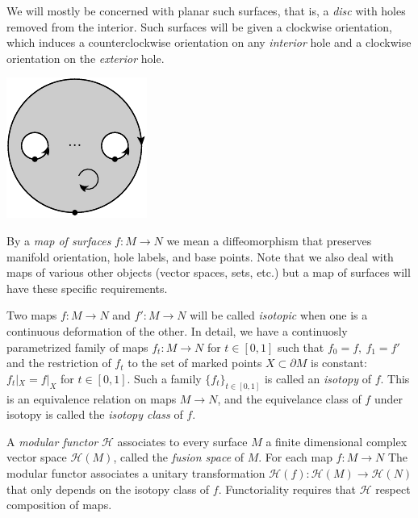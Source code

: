 \documentclass[aps, prl, letterpaper, twocolumn, superscriptaddress, notitlepage, 10pt]{revtex4-1}
\newcommand{\F}{\mathscr{H}} %
\begin{document}
We will mostly be concerned with planar such
surfaces, that is, a \emph{disc} with holes removed from the
interior.
Such surfaces will be given a clockwise 
orientation, which induces a counterclockwise orientation on
any \emph{interior} hole and a clockwise orientation
on the \emph{exterior} hole.
\begin{center}
\includegraphics[]{pic-disc.pdf}
\end{center}

By a \emph{map of surfaces} $f:M\to N$ we mean 
a diffeomorphism that preserves
manifold orientation, hole labels, and base points.
Note that we also deal with maps of various other objects
(vector spaces, sets, etc.)
but a map of surfaces will have these specific
requirements.

Two maps $f:M\to N$ and $f':M\to N$
will be called \emph{isotopic}
when one is a continuous deformation of the other.
In detail,
we have a continuosly
parametrized family of maps $f_t:M\to N$ for $t\in [0, 1]$
such that $f_0=f,\ f_1=f'$
and the restriction of $f_t$ to the 
set of marked points $X\subset\partial M$ is constant:
$f_t|_{X} = f|_{X}$ for $t\in [0, 1].$
Such a family $\{f_t\}_{t\in [0,1]}$ is called an \emph{isotopy}
of $f.$
This is an equivalence relation on maps $M\to N$, and the equivelance
class of $f$ under isotopy is called the \emph{isotopy class} of $f.$

A \emph{modular functor} $\F$ associates to every
surface $M$ a finite dimensional complex
vector space $\F(M)$, called the \emph{fusion space} of $M$.
For each map $f:M\to N$
The modular functor associates a
unitary transformation $\F(f) : \F(M)\to\F(N)$
that only depends on the isotopy class of $f.$
Functoriality requires that $\F$
respect composition of maps.
\end{document}
